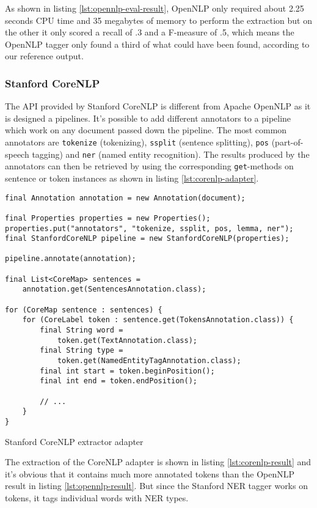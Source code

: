 As shown in listing \ref{lst:opennlp-eval-result}, OpenNLP only required about 2.25 seconds CPU time and 35 megabytes of memory to perform the extraction but on the other it only scored a recall of .3 and a F-measure of .5, which means the OpenNLP tagger only found a third of what could have been found, according to our reference output.

\subsubsection{Stanford CoreNLP}
The \gls{API} provided by Stanford CoreNLP is different from Apache OpenNLP as it is designed a pipelines. It's possible to add different annotators to a pipeline which work on any document passed down the pipeline. The most common annotators are \texttt{tokenize} (tokenizing), \texttt{ssplit} (sentence splitting), \texttt{pos} (part-of-speech tagging) and \texttt{ner} (named entity recognition). The results produced by the annotators can then be retrieved by using the corresponding \texttt{get}-methods on sentence or token instances as shown in listing \ref{lst:corenlp-adapter}.

\begin{listing}[H]
\begin{verbatim}
final Annotation annotation = new Annotation(document);

final Properties properties = new Properties();
properties.put("annotators", "tokenize, ssplit, pos, lemma, ner");
final StanfordCoreNLP pipeline = new StanfordCoreNLP(properties);

pipeline.annotate(annotation);

final List<CoreMap> sentences = 
    annotation.get(SentencesAnnotation.class);

for (CoreMap sentence : sentences) {
    for (CoreLabel token : sentence.get(TokensAnnotation.class)) {
        final String word = 
            token.get(TextAnnotation.class);
        final String type = 
            token.get(NamedEntityTagAnnotation.class);
        final int start = token.beginPosition();
        final int end = token.endPosition();

        // ...
    }
}
\end{verbatim}
\caption{Stanford CoreNLP extractor adapter}
\label{lst:corenlp-adapter}
\end{listing}

\newpage
The extraction of the CoreNLP adapter is shown in listing \ref{lst:corenlp-result} and it's obvious that it contains much more annotated tokens than the OpenNLP result in listing \ref{lst:opennlp-result}. But since the Stanford \gls{NER} tagger works on tokens, it tags individual words with \gls{NER} types.

